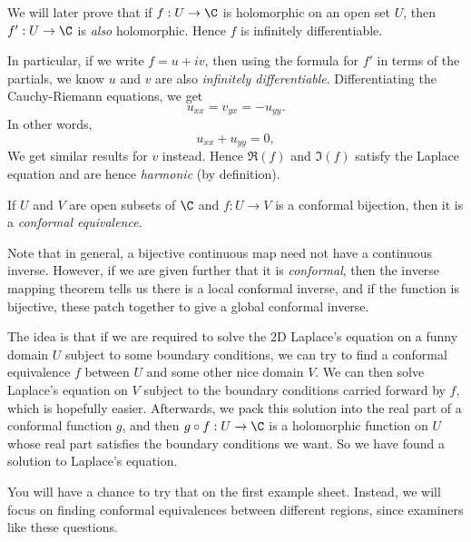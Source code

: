 \documentclass[a4paper]{article}
\begin{document}
We will later prove that if $f: U \to \C$ is holomorphic on an open set $U$, then $f': U \to \C$ is \emph{also} holomorphic. Hence $f$ is infinitely differentiable.

In particular, if we write $f = u + iv$, then using the formula for $f'$ in terms of the partials, we know $u$ and $v$ are also \emph{infinitely differentiable}. Differentiating the Cauchy-Riemann equations, we get
\[
  u_{xx} = v_{yx} = -u_{yy}.
\]
In other words,
\[
  u_{xx} + u_{yy} = 0,
\]
We get similar results for $v$ instead. Hence $\Re(f)$ and $\Im(f)$ satisfy the Laplace equation and are hence \emph{harmonic} (by definition).

\begin{defi}
  If $U$ and $V$ are open subsets of $\C$ and $f: U \to V$ is a conformal bijection, then it is a \emph{conformal equivalence}.
\end{defi}
Note that in general, a bijective continuous map need not have a continuous inverse. However, if we are given further that it is \emph{conformal}, then the inverse mapping theorem tells us there is a local conformal inverse, and if the function is bijective, these patch together to give a global conformal inverse.

The idea is that if we are required to solve the 2D Laplace's equation on a funny domain $U$ subject to some boundary conditions, we can try to find a conformal equivalence $f$ between $U$ and some other nice domain $V$. We can then solve Laplace's equation on $V$ subject to the boundary conditions carried forward by $f$, which is hopefully easier. Afterwards, we pack this solution into the real part of a conformal function $g$, and then $g \circ f: U \to \C$ is a holomorphic function on $U$ whose real part satisfies the boundary conditions we want. So we have found a solution to Laplace's equation.

You will have a chance to try that on the first example sheet. Instead, we will focus on finding conformal equivalences between different regions, since examiners like these questions.
\end{document}
